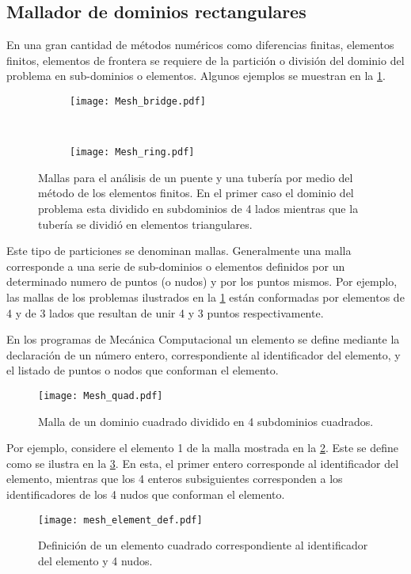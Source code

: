 \subsection{Mallador de dominios rectangulares}
En una gran cantidad de métodos numéricos como diferencias finitas, elementos finitos, elementos de frontera se requiere de la partición o división del dominio del problema en sub-dominios o elementos. Algunos ejemplos se muestran en la \cref{fig:meshes}.
\begin{figure}[H]
\centering
    \begin{subfigure}[t]{0.48\textwidth}
		\texttt{[image: Mesh\_bridge.pdf]}
		\caption{}
	\end{subfigure}\,
    \begin{subfigure}[t]{0.35\textwidth}
		\texttt{[image: Mesh\_ring.pdf]}
		\caption{}
	\end{subfigure}
\caption{Mallas para el análisis de un puente y una tubería por medio del método de los elementos finitos. En el primer caso el dominio del problema esta dividido en subdominios de 4 lados mientras que la tubería se dividió en elementos triangulares.}
\label{fig:meshes}
\end{figure}

Este tipo de particiones se denominan mallas. Generalmente una malla corresponde a una serie de sub-dominios o elementos definidos por un determinado numero de puntos (o nudos) y por los puntos mismos. Por ejemplo, las mallas de los problemas ilustrados en la \cref{fig:meshes} están conformadas por elementos de 4 y de 3 lados que resultan de unir 4 y 3 puntos respectivamente.

En los programas de Mecánica Computacional un elemento se define mediante la declaración de un número entero, correspondiente al identificador del elemento, y el listado de puntos o nodos que conforman el elemento.
\begin{figure}[H]
\centering
\texttt{[image: Mesh\_quad.pdf]}
\caption{Malla de un dominio cuadrado dividido en 4 subdominios cuadrados.}
\label{fig:quad}
\end{figure}


Por ejemplo, considere el elemento 1 de la malla mostrada en la \cref{fig:quad}. Este se define como se ilustra en la \cref{fig:eledef}. En esta, el primer entero corresponde al identificador del elemento, mientras que los 4 enteros subsiguientes corresponden a los identificadores de los 4 nudos que conforman el elemento.
\begin{figure}[H]
\centering
\texttt{[image: mesh\_element\_def.pdf]}
\caption{Definición de un elemento cuadrado correspondiente al identificador del elemento y 4 nudos.}
\label{fig:eledef}
\end{figure}

